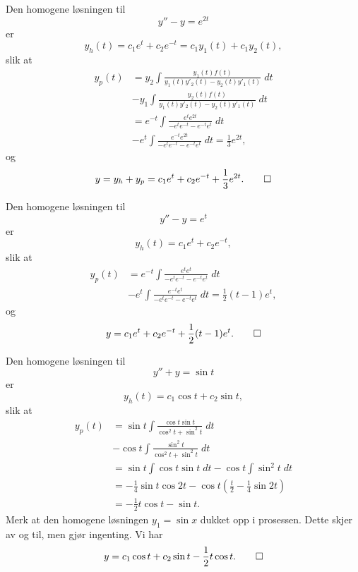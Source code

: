\begin{ex}
Den homogene løsningen til 
\[
y''-y=e^{2t}
\]
er
\[
y_h(t)=c_1e^t+c_2e^{-t}=c_1 y_1(t)+c_1 y_2(t),
\]
slik at 
\begin{align*}
y_p(t)&=y_2\int \frac{y_1(t)f(t)}{y_1(t)y'_2(t)-y_2(t)y'_1(t)}\; dt \\ &-y_1\int \frac{y_2(t)f(t)}{y_1(t)y'_2(t)-y_2(t)y'_1(t)}\; dt\\&=e^{-t}\int \frac{e^te^{2t}}{-e^{t}e^{-t}-e^{-t}e^{t}}\; dt \\ &-e^{t}\int \frac{e^{-t}e^{2t}}{-e^{t}e^{-t}-e^{-t}e^{t}}\; dt= \frac{1}{3}e^{2t},
\end{align*}
og
\[
y=y_h+y_p=c_1e^t+c_2e^{-t}+\frac{1}{3}e^{2t}.  \qedhere
\]
\end{ex}


\begin{ex}
Den homogene løsningen til 
\[
y''-y=e^{t}
\]
er
\[
y_h(t)=c_1e^t+c_2e^{-t},
\]
slik at 
\begin{align*}
y_p(t)&=e^{-t}\int \frac{e^te^{t}}{-e^{t}e^{-t}-e^{-t}e^{t}}\; dt \\ &-e^{t}\int \frac{e^{-t}e^{t}}{-e^{t}e^{-t}-e^{-t}e^{t}}\; dt= \frac{1}{2}(t-1)e^{t},
\end{align*}
og
\[
y=c_1e^t+c_2e^{-t}+\frac{1}{2}(t-1)e^{t}.  \qedhere
\]
\end{ex}

\begin{ex}
Den homogene løsningen til 
\[
y''+y=\sin t
\]
er
\[
y_h(t)=c_1\cos t+c_2\sin t,
\]
slik at 
\begin{align*}
y_p(t)&=\sin t \int \frac{\cos t \sin t}{\cos^2 t+\sin^2 t}\; dt \\ &-\cos t \int \frac{\sin^2 t}{\cos^2 t+\sin^2 t}\; dt\\
&=\sin t \int \cos t \sin t\; dt -\cos t \int \sin^2 t\; dt\\
&=-\frac{1}{4}\sin t \cos 2t  -\cos t \left(\frac{t}{2}-\frac{1}{4}\sin 2t\right)\\ 
&= -\frac{1}{2}t\cos t-\sin t. 
\end{align*}
Merk at den homogene løsningen $y_1=\sin x$ dukket opp i prosessen. 
Dette skjer av og til, men gjør ingenting. Vi har 
\[
y=c_1 \cos t + c_2 \sin t - \frac{1}{2}t\cos t. \qedhere
\]
\end{ex}


